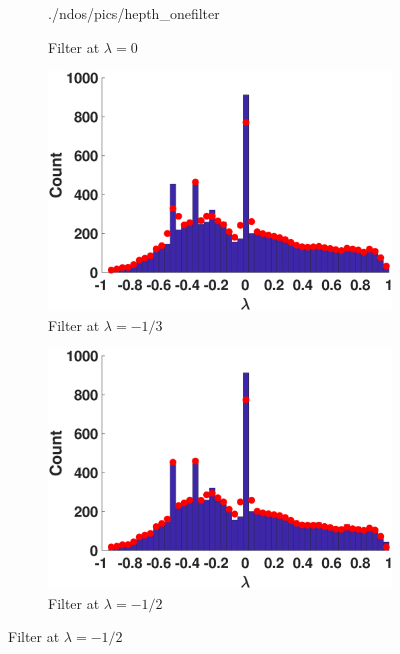 \begin{figure}
\begin{subfigure}{0.47\textwidth}
    {./ndos/pics/hepth_onefilter}
    \caption{Filter at $\lambda=0$}\label{fig:hepth_1filt}
  \end{subfigure}
  \begin{subfigure}{0.47\textwidth}
    \centering
    \captionsetup{justification=centering}
    \includegraphics[width=\textwidth,trim = .3cm 0.5cm 3.2cm 1.3cm,clip]
    {./ndos/pics/hepth_twofilter}
    \caption{Filter at $\lambda=-1/3$}\label{fig:hepth_2filt}
  \end{subfigure}
  \begin{subfigure}{0.47\textwidth}
    \centering
    \captionsetup{justification=centering}
    \includegraphics[width=\textwidth,trim = .3cm 0.5cm 3.2cm 1.3cm,clip]
    {./ndos/pics/hepth_threefilter}
    \caption{Filter at $\lambda=-1/2$}\label{fig:hepth_3filt}
  \end{subfigure}

\end{figure}
